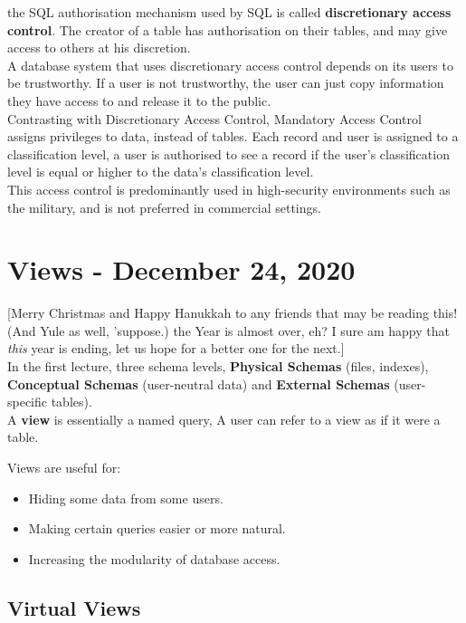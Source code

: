 \documentclass[11pt,a4paper,twocolumn]{book}
\begin{document}
the SQL authorisation mechanism used by SQL is called \textbf{discretionary access control}. The creator of a table has authorisation on their tables, and may give access to others at his discretion.\\

A database system that uses discretionary access control depends on its users to be trustworthy. If a user is not trustworthy, the user can just copy information they have access to and release it to the public.\\

Contrasting with Discretionary Access Control, Mandatory Access Control assigns privileges to data, instead of tables. Each record and user is assigned to a classification level, a user is authorised to see a record if the user's classification level is equal or higher to the data's classification level.\\

This access control is predominantly used in high-security environments such as the military, and is not preferred in commercial settings.

\chapter{Views - December 24, 2020}

[Merry Christmas and Happy Hanukkah to any friends that may be reading this! (And Yule as well, 'suppose.) the Year is almost over, eh? I sure am happy that \textit{this} year is ending, let us hope for a better one for the next.]\\

In the first lecture, three schema levels, \textbf{Physical Schemas} (files, indexes), \textbf{Conceptual Schemas} (user-neutral data) and \textbf{External Schemas} (user-specific tables).\\

A \textbf{view} is essentially a named query, A user can refer to a view as if it were a table.

Views are useful for:

\begin{itemize}
\item Hiding some data from some users.
\item Making certain queries easier or more natural.
\item Increasing the modularity of database access.
\end{itemize}

\section{Virtual Views}
\end{document}
